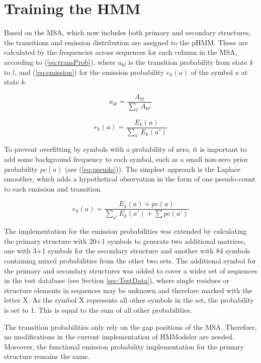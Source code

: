 \section{Training the HMM}
\label{sec:training}

Based on the \ac{MSA}, which now includes both primary and secondary structures, the transitions and emission distribution are assigned to the \ac{pHMM}.
These are calculated by the frequencies across sequences for each column in the \ac{MSA}, according to (\ref{eq:transProb}), where $a_{kl}$ is the transition probability from state $k$ to $l$, and (\ref{eq:emission}) for the emission probability $e_k(a)$ of the symbol $a$ at state $k$. 

\begin{equation}
a_{kl} = \frac{A_{kl}}{\sum_{l'}A_{kl'}}
\label{eq:transProb}
\end{equation}

\begin{equation}
e_{k}(a) = \frac{E_k(a)}{\sum_{a'}E_k(a')}
\label{eq:emission}
\end{equation}

To prevent overfitting by symbols with a probability of zero, it is important to add some background frequency to each symbol, such as a small non-zero prior probability $pc(a)$ (see (\ref{eq:pseudo})). The simplest approach is the Laplace smoother, which adds a hypothetical observation in the form of one pseudo-count to each emission and transition.

\begin{equation}
e_{k}(a) = \frac{E_k(a) + pc(a)}{\sum_{a'}E_k(a') + \sum pc(a')}
\label{eq:pseudo}
\end{equation}


The implementation for the emission probabilities was extended by calculating the primary structure with 20+1 symbols to generate two additional matrices, one with 3+1 symbols for the secondary structure and another with 84 symbols containing mixed probabilities from the other two sets. The additional symbol for the primary and secondary structures was added to cover a wider set of sequences in the test database (see Section \ref{sec:TestData}), where single residues or structure elements in sequences may be unknown and therefore marked with the letter X. As the symbol X represents all other symbols in the set, the probability is set to 1. This is equal to the sum of all other probabilities. 


The transition probabilities only rely  on the gap positions of the \ac{MSA}. Therefore, no modifications in the current implementation of HMModeler are needed. Moreover, the functional emission probability implementation for the primary structure remains the same.

